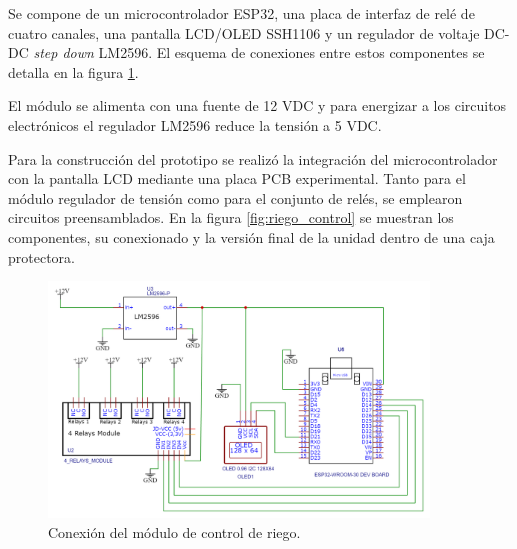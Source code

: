Se compone de un microcontrolador ESP32, una placa de interfaz de relé de cuatro canales, una pantalla LCD/OLED SSH1106 y un regulador de voltaje DC-DC \textit{step down} LM2596. El esquema de conexiones entre estos componentes se detalla en la figura \ref{fig:riegochem}.

El módulo se alimenta con una fuente de 12 VDC y para energizar a los circuitos electrónicos el regulador LM2596 reduce la tensión a 5 VDC.

Para la construcción del prototipo se realizó la integración del microcontrolador con la pantalla LCD mediante una placa PCB experimental. Tanto para el módulo regulador de tensión como para el conjunto de relés, se emplearon circuitos preensamblados. En la figura \ref{fig:riego_control} se muestran los componentes, su conexionado y la versión final de la unidad dentro de una caja protectora.   


\begin{figure}[!h]
	\centering
	\includegraphics[width=0.9\textwidth]{./Figures/pump_schem.png}
	\caption[Conexión del módulo de control de riego]{Conexión del módulo de control de riego.}
	\label{fig:riegochem}
\end{figure}



